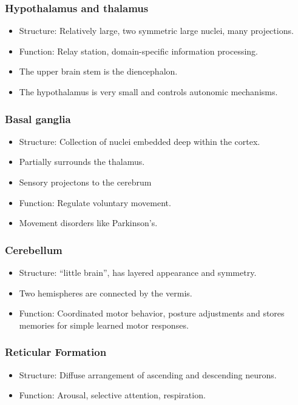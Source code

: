 \documentclass[a4paper, 12pt]{article}
\begin{document}
\subsubsection{Hypothalamus and thalamus}
\begin{itemize}[noitemsep,nolistsep]
	\item Structure: Relatively large, two symmetric large nuclei, many projections.
	\item Function: Relay station, domain-specific information processing.
	\item The upper brain stem is the diencephalon.
	\item The hypothalamus is very small and controls autonomic mechanisms.
\end{itemize}
\subsubsection{Basal ganglia}
\begin{itemize}[noitemsep,nolistsep]
	\item Structure: Collection of nuclei embedded deep within the cortex.
	\item Partially surrounds the thalamus.
	\item Sensory projectons to the cerebrum
	\item Function: Regulate voluntary movement.
	\item Movement disorders like Parkinson's.
\end{itemize}
\subsubsection{Cerebellum}
\begin{itemize}[noitemsep,nolistsep]
	\item Structure: ``little brain'', has layered appearance and symmetry.
	\item Two hemispheres are connected by the vermis.
	\item Function: Coordinated motor behavior, posture adjustments and stores memories for simple learned motor responses.
\end{itemize}
\subsubsection{Reticular Formation}
\begin{itemize}[noitemsep,nolistsep]
	\item Structure: Diffuse arrangement of ascending and descending neurons.
	\item Function: Arousal, selective attention, respiration.
\end{itemize}
\end{document}
